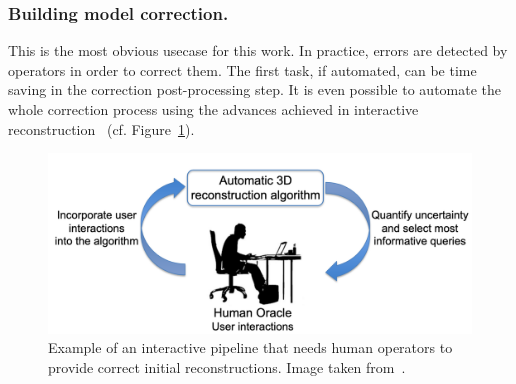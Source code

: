        \subsubsection{Building model correction.}
            This is the most obvious usecase for this work.
            In practice, errors are detected by operators in order to correct them.
            The first task, if automated, can be time saving in the correction post-processing step.
            It is even possible to automate the whole correction process using the advances achieved in interactive reconstruction~\parencite{kowdle2011active} (cf. Figure~\ref{fig::corrections}).
            \begin{figure}[htb]
                \centering
                \includegraphics[width=.7\textwidth]{images/introduction/use/active_learning_kowdle}
                \caption[
                    Example of an interactive pipeline that needs human operators to provide correct initial reconstructions.
                ]{
                    \label{fig::corrections}
                    Example of an interactive pipeline that needs human operators to provide correct initial reconstructions.
                    Image taken from~\parencite{kowdle2011active}.
                }
            \end{figure}

